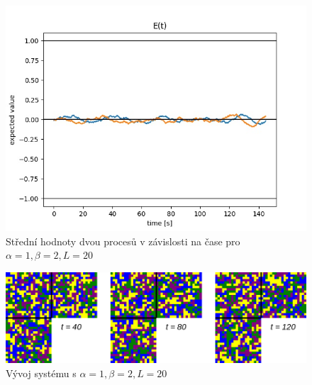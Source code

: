 \documentclass{article}
\begin{document}
\begin{figure}[H]
    \includegraphics[scale=0.8]{A1B2L20_graph}
    \caption{Střední hodnoty dvou procesů v závislosti na čase pro $\alpha = 1, \beta = 2, L = 20$}
\end{figure}
\begin{figure}[H]
    \includegraphics[scale=0.4]{A1B2L20_evolution}
    \caption{Vývoj systému s $\alpha = 1, \beta = 2, L = 20$}
\end{figure}
\end{document}

